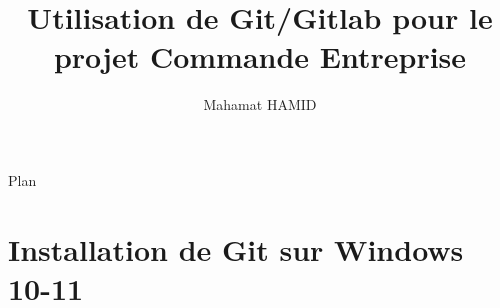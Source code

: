 \documentclass[aspectratio=169]{beamer}
\title{Utilisation de Git/Gitlab pour le projet Commande Entreprise}
\author{Mahamat HAMID}
\begin{document}
	\begin{frame}
		\titlepage
	\end{frame}

\begin{frame}{Plan}
	\tableofcontents%
\end{frame}


\section{Installation de Git sur Windows 10-11}
\end{document}
